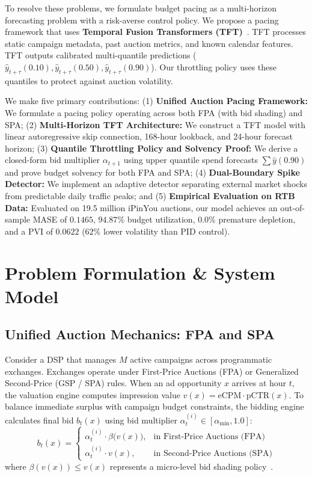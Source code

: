 \documentclass[sigconf]{acmart}
\begin{document}
To resolve these problems, we formulate budget pacing as a multi-horizon forecasting problem with a risk-averse control policy. We propose a pacing framework that uses \textbf{Temporal Fusion Transformers (TFT)}~\cite{lim2021temporal}. TFT processes static campaign metadata, past auction metrics, and known calendar features. TFT outputs calibrated multi-quantile predictions ($\hat{y}_{t+\tau}(0.10), \hat{y}_{t+\tau}(0.50), \hat{y}_{t+\tau}(0.90)$). Our throttling policy uses these quantiles to protect against auction volatility.

We make five primary contributions: (1) \textbf{Unified Auction Pacing Framework:} We formulate a pacing policy operating across both FPA (with bid shading) and SPA; (2) \textbf{Multi-Horizon TFT Architecture:} We construct a TFT model with linear autoregressive skip connection, 168-hour lookback, and 24-hour forecast horizon; (3) \textbf{Quantile Throttling Policy and Solvency Proof:} We derive a closed-form bid multiplier $\alpha_{t+1}$ using upper quantile spend forecasts $\sum \hat{y}(0.90)$ and prove budget solvency for both FPA and SPA; (4) \textbf{Dual-Boundary Spike Detector:} We implement an adaptive detector separating external market shocks from predictable daily traffic peaks; and (5) \textbf{Empirical Evaluation on RTB Data:} Evaluated on 19.5 million iPinYou auctions, our model achieves an out-of-sample MASE of $0.1465$, $94.87\%$ budget utilization, $0.0\%$ premature depletion, and a PVI of $0.0622$ ($62\%$ lower volatility than PID control).

\section{Problem Formulation \& System Model}

\subsection{Unified Auction Mechanics: FPA and SPA}
Consider a DSP that manages $M$ active campaigns across programmatic exchanges. Exchanges operate under First-Price Auctions (FPA) or Generalized Second-Price (GSP / SPA) rules. When an ad opportunity $x$ arrives at hour $t$, the valuation engine computes impression value $v(x) = \text{eCPM} \cdot \text{pCTR}(x)$. To balance immediate surplus with campaign budget constraints, the bidding engine calculates final bid $b_t(x)$ using bid multiplier $\alpha_t^{(i)} \in [\alpha_{\min}, 1.0]$:
\begin{equation}
  b_t(x) =
  \begin{cases}
    \alpha_t^{(i)} \cdot \beta\big(v(x)\big), & \text{in First-Price Auctions (FPA)} \\
    \alpha_t^{(i)} \cdot v(x), & \text{in Second-Price Auctions (SPA)}
  \end{cases}
  \label{eq:bidding_mechanisms}
\end{equation}
where $\beta(v(x)) \le v(x)$ represents a micro-level bid shading policy~\cite{zhou2021bid,balseiro2021budget}.
\end{document}

